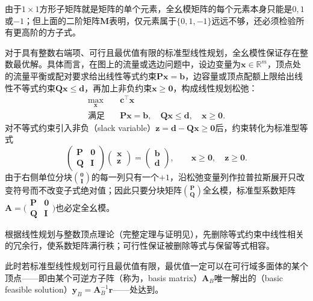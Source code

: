 由于$1\times1$方形子矩阵就是矩阵的单个元素，全幺模矩阵的每个元素本身只能是$0,1$或$-1$；但上面的二阶矩阵$\bm{M}$表明，仅元素属于$\{0,1,-1\}$远远不够，还必须检验所有更高阶的方子式。

对于具有整数右端项、可行且最优值有限的标准型线性规划，全幺模性保证存在整数最优解。具体而言，在图上的流量或选边问题中，设边变量为$\bm{x}\in\mathbb{R}^m$，顶点处的流量平衡或配对要求给出线性等式约束$\bm{P}\bm{x}=\bm{b}$，边容量或顶点配额上限给出线性不等式约束$\bm{Q}\bm{x}\leq\bm{d}$，再加上非负约束$\bm{x}\geq\bm{0}$，构成线性规划松弛：
\begin{equation}
\begin{aligned}
\max_{\bm{x}}\quad &\bm{c}^\top\bm{x}\\
\text{满足}\quad &\bm{P}\bm{x}=\bm{b},\quad
\bm{Q}\bm{x}\leq\bm{d},\quad \bm{x}\geq\bm{0}.
\end{aligned}
\label{eq:incidence-lp-relaxation}
\end{equation}
对不等式约束引入非负（slack variable）$\bm{z}=\bm{d}-\bm{Q}\bm{x}\geq\bm{0}$后，约束转化为标准型等式
\begin{equation}
\begin{pmatrix}
\bm{P}&\bm{0}\\
\bm{Q}&\bm{I}
\end{pmatrix}
\begin{pmatrix}\bm{x}\\\bm{z}\end{pmatrix}
=
\begin{pmatrix}\bm{b}\\\bm{d}\end{pmatrix},
\qquad \bm{x}\geq\bm{0},\quad \bm{z}\geq\bm{0}.
\label{eq:incidence-lp-slack-matrix}
\end{equation}
由于右侧单位分块$\binom{\bm{0}}{\bm{I}}$的每一列只有一个$+1$，沿松弛变量列作拉普拉斯展开只改变符号而不改变子式绝对值；因此只要分块矩阵$\binom{\bm{P}}{\bm{Q}}$全幺模，标准型系数矩阵$\bm{A}=\bigl(\begin{smallmatrix}\bm{P}&\bm{0}\\\bm{Q}&\bm{I}\end{smallmatrix}\bigr)$也必定全幺模。

根据线性规划与整数顶点理论（完整定理与证明见），先删除等式约束中线性相关的冗余行，使系数矩阵满行秩；可行性保证被删除等式与保留等式相容。

此时若标准型线性规划可行且最优值有限，最优值一定可以在可行域多面体的某个顶点——即由某个可逆方子阵（称为，basis matrix）$\bm{A}_B$唯一解出的（basic feasible solution）$\bm{y}_B=\bm{A}_B^{-1}\bm{r}$——处达到。

